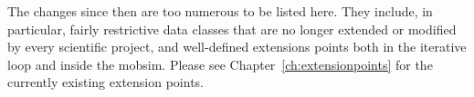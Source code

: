 The changes since then are too numerous to be listed here.  They include, in particular, fairly restrictive data classes that are no longer extended or modified by every scientific project, and well-defined extensions points both in the iterative loop and inside the mobsim.  Please see Chapter~\ref{ch:extensionpoints} for the currently existing extension points.




